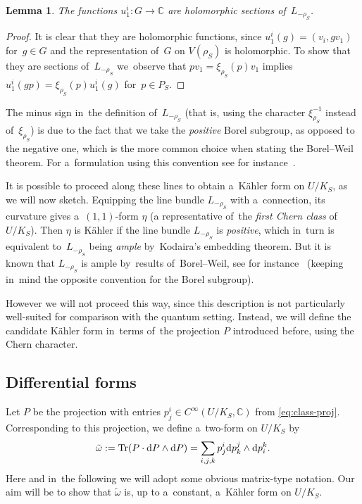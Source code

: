 \documentclass[pdftex]{sigma}
\numberwithin{equation}{section}
\newtheorem{Lemma}[Theorem]{Lemma}
\newcommand{\diff}{\mathrm{d}}
\newcommand{\bbC}{\mathbb{C}}
\newcommand{\weiS}{\rho_S}
\newcommand{\charS}{\xi_{\weiS}}
\newcommand{\kafot}{\tilde{\omega}}
\begin{document}
\begin{Lemma}
The functions $u^i_1\colon G \to \bbC$ are holomorphic sections of~$L_{-\rho_S}$.
\end{Lemma}

\begin{proof}
It is clear that they are holomorphic functions, since $u^i_1(g) = (v_i, g v_1)$ for~$g \in G$ and the representation of~$G$ on $V(\rho_S)$ is holomorphic.
To show that they are sections of~$L_{-\rho_S}$ we~observe that $p v_1 = \charS(p) v_1$ implies $u^i_1(g p) = \charS(p) u^i_1(g)$ for~$p \in P_S$.
\end{proof}

\begin{Remark}
The minus sign in~the definition of~$L_{-\rho_S}$ (that is, using the character $\charS^{-1}$ instead of~$\charS$) is due to the fact that we take the \emph{positive} Borel subgroup, as opposed to the negative one, which is the more common choice when stating the Borel--Weil theorem.
For a~formulation using this convention see for instance~\cite[Theorem~7.58]{sepanski}.
\end{Remark}

It is possible to proceed along these lines to obtain a~K\"ahler form on $U / K_S$, as we will now sketch.
Equipping the line bundle $L_{-\rho_S}$ with a~connection, its curvature gives a~$(1, 1)$-form $\eta$ (a representative of~the \emph{first Chern class} of~$U / K_S$).
Then $\eta$ is K\"ahler if the line bundle $L_{-\rho_S}$ is \emph{positive}, which in~turn is equivalent to~$L_{-\rho_S}$ being \emph{ample} by~Kodaira's embedding theorem.
But it is known that $L_{-\rho_S}$ is ample by~results of~Borel--Weil, see for instance~\cite[Theorem~6.5]{snow} (keeping in~mind the opposite convention for the Borel subgroup).

However we will not proceed this way, since this description is not particularly well-suited for comparison with the quantum setting.
Instead, we will define the candidate K\"ahler form in~terms of~the projection $P$ introduced before, using the Chern character.

\subsection{Differential forms}

Let $P$ be the projection with entries $p^i_j \in C^\infty(U / K_S, \bbC)$ from \eqref{eq:class-proj}.
Corresponding to this projection, we define a~two-form on $U / K_S$ by
\[
\kafot := \mathop{\rm Tr}(P \cdot \diff P \wedge \diff P) = \sum_{i, j, k} p^i_j \diff p^j_k \wedge \diff p^k_i.
\]
Here and in~the following we will adopt some obvious matrix-type notation.
Our aim will be to show that $\tilde{\omega}$ is, up to a~constant, a~K\"ahler form on $U / K_S$.
\end{document}
